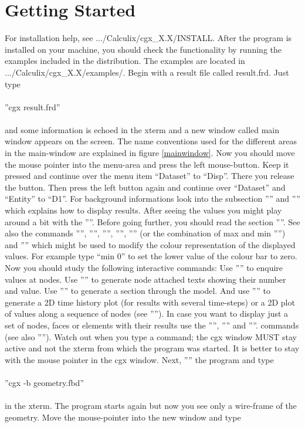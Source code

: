 \documentclass{article}
\begin{document}
\section{\label{Getting Started}Getting Started}
For installation help, see .../Calculix/cgx\_X.X/INSTALL. After the program is installed on your machine, you should check the functionality by running the examples included in the distribution. The examples are located in .../Calculix/cgx\_X.X/examples/. Begin with a result file called result.frd. Just type\\\\  ''cgx result.frd''\\\\and some information is echoed in the xterm and a new window called main window appears on the screen. The name conventions used for the different areas in the main-window are explained in figure \ref{mainwindow}. Now you should move the mouse pointer into the menu-area and press the left mouse-button. Keep it pressed and continue over the menu item ``Dataset'' to ``Disp''. There you release the button. Then press the left button again and continue over ``Dataset'' and ``Entity'' to ``D1''. For background informations look into the subsection '''' and '''' which explains how to display results. After seeing the values you might play around a bit with the ''''. Before going further, you should read the section ''''. See also the commands '''', '''', '''', '''', '''' (or the combination of max and min '''') and '''' which might be used to modify the colour representation of the displayed values. For example type ``min 0'' to set the lower value of the colour bar to zero. Now you should study the following interactive commands: Use '''' to enquire values at nodes. Use '''' to generate node attached texts showing their number and value. Use '''' to generate a section through the model. And use '''' to generate a 2D time history plot (for results with several time-steps) or a 2D plot of values along a sequence of nodes (see ''''). In case you want to display just a set of nodes, faces or elements with their results use the '''', '''' and ''''. commands (see also '''').  Watch out when you type a command; the cgx window MUST stay active and not the xterm from which the program was started. It is better to stay with the mouse pointer in the cgx window. Next, '''' the program and type\\\\  ''cgx -b geometry.fbd''\\\\in the xterm. The program starts again but now you see only a wire-frame of the geometry. Move the mouse-pointer into the new window and type 
\end{document}
